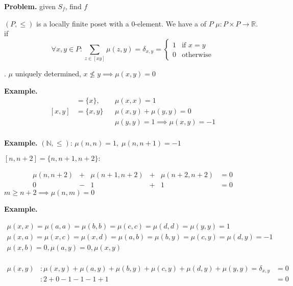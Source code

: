 \textbf{Problem.}
given $S_f$, find $f$

\begin{definition}
$(P, \leq)$ is a locally finite poset with a 0-element.
We have a  of $P$ $\mu: P\times P \rightarrow \mathbb{R}$.
if
\[
  \forall x,y \in P: \sum_{z\in [xy]} \mu(z,y) = \delta_{x,y} =
    \begin{cases}
      1 & \text{if } x = y \\
      0 & \text{otherwise}
    \end{cases}
\]
\end{definition}

\Remark.
$\mu$ uniquely determined, $x \not\leq y \implies \mu(x,y) = 0$

\textbf{Example.}
\begin{align*}
  [x,x] & = \{x\}, && \mu(x,x) = 1 \\
  [x,y] &= \{x,y\} && \mu(x,y) + \mu(y,y) = 0 \\
        &          && \mu(y,y) = 1 \implies \mu(x,y) = -1 \\
\end{align*}

\textbf{Example.}
$(\mathbb{N}, \leq)$: $\mu(n,n) = 1,\; \mu(n,n+1) = -1$

$[n,n+2] = \{n,n+1, n+2\}:$

\[
\begin{matrix}
  \mu(n,n+2) & + & \mu(n+1,n+2) & + & \mu(n+2, n+2) & = 0 \\
  0 & -&1 &+&1 & = 0
\end{matrix}
\]
$ m \geq n+2 \implies \mu(n,m) = 0$

\textbf{Example.}

\begin{gather*}
    \mu(x,x) = \mu(a,a) = \mu(b,b) = \mu(c,c) = \mu(d,d) = \mu(y,y) = 1\\
    \mu(x,a) = \mu(x,c) = \mu(x,d) = \mu(a,b) = \mu(b,y) = \mu(c,y) = \mu(d,y) = -1\\
    \mu(x,b) = 0, \mu(a,y) = 0, \mu(x,y) \\
\end{gather*}

\begin{align*}
    \mu(x,y)&: \mu(x,y) + \mu(a,y) + \mu(b,y) + \mu(c,y) + \mu(d,y) + \mu(y,y) = \delta_{x,y} &= 0 \\
        &: 2 +0 -1 -1 -1 +1 &= 0
\end{align*}


